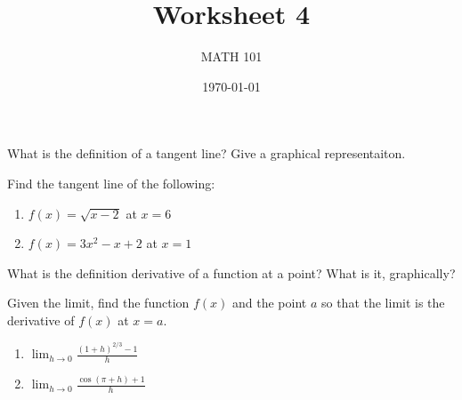 \documentclass[12pt]{amsart}
\title{ Worksheet 4}
\author{MATH 101}
\date{\today}
\begin{document}
\maketitle


\begin{question}
	What is the definition of a tangent line?
	Give a graphical representaiton.
\end{question}

\begin{question}
	Find the tangent line of the following:
	\begin{enumerate}
		\item $f(x) = \sqrt{x - 2} $ at $x = 6$
		      \vspace{5cm}
		\item $f(x) = 3x^2 - x + 2$ at $x = 1$
		      \vspace{5cm}
	\end{enumerate}
\end{question}

\begin{question}
	What is the definition derivative of a function at a point?
	What is it, graphically?
\end{question}
\vspace{5cm}

\begin{question}
	Given the limit, find the function $f(x)$ and the point $a$ so that the limit
	is the derivative of $f(x)$ at $x=a$.

	\begin{enumerate}
		\item $\displaystyle \lim_{h\to 0} \frac{ (1 + h)^{2/3} -1}{h}$
		      \vspace{5cm}
		\item $\displaystyle \lim_{h\to 0} \frac{ \cos(\pi + h) + 1}{h}$
		      \vspace{5cm}
	\end{enumerate}
\end{question}
\end{document}
